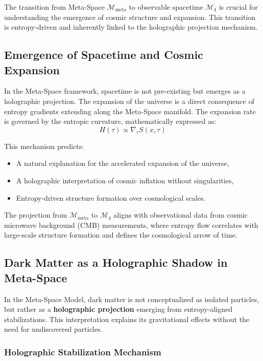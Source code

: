 \documentclass[10.5pt,a4paper]{article}
\begin{document}
The transition from Meta-Space \(\mathcal{M}_{\text{meta}}\) to observable spacetime \(\mathcal{M}_4\) is crucial for understanding the emergence of cosmic structure and expansion. This transition is entropy-driven and inherently linked to the holographic projection mechanism.

\subsection{Emergence of Spacetime and Cosmic Expansion}

In the Meta-Space framework, spacetime is not pre-existing but emerges as a holographic projection. The expansion of the universe is a direct consequence of entropy gradients extending along the Meta-Space manifold. The expansion rate is governed by the entropic curvature, mathematically expressed as:
\[
H(\tau) \propto \nabla_\tau S(x, \tau)
\]

This mechanism predicts:
\begin{itemize}
    \item A natural explanation for the accelerated expansion of the universe,
    \item A holographic interpretation of cosmic inflation without singularities,
    \item Entropy-driven structure formation over cosmological scales.
\end{itemize}

The projection from \(\mathcal{M}_{\text{meta}}\) to \(\mathcal{M}_4\) aligns with observational data from cosmic microwave background (CMB) measurements, where entropy flow correlates with large-scale structure formation and defines the cosmological arrow of time.

\subsection{Dark Matter as a Holographic Shadow in Meta-Space}

In the Meta-Space Model, dark matter is not conceptualized as isolated particles, but rather as a \textbf{holographic projection} emerging from entropy-aligned stabilizations. This interpretation explains its gravitational effects without the need for undiscovered particles.

\subsubsection{Holographic Stabilization Mechanism}
\end{document}
